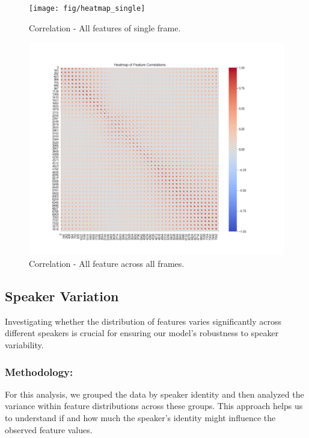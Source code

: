 \begin{figure}[!ht]
	\centering
	\begin{minipage}{0.49\textwidth}
		\centering
		\texttt{[image: fig/heatmap\_single]}
		\caption{Correlation - All features of single frame.}
		\label{fig:SpeakersZcr0}
	\end{minipage}\hfill
	\begin{minipage}{0.49\textwidth}
		\centering
		\includegraphics[scale=0.3]{fig/heatmap_all}
		\caption{Correlation - All feature across all frames.}
		\label{fig:Speakers Dist}
	\end{minipage}
\end{figure}

\subsection{Speaker Variation}

Investigating whether the distribution of features varies significantly across different speakers is crucial for ensuring our model's robustness to speaker variability.

\subsubsection{Methodology:}

For this analysis, we grouped the data by speaker identity and then analyzed the variance within feature distributions across these groups.
This approach helps us to understand if and how much the speaker's identity might influence the observed feature values.

